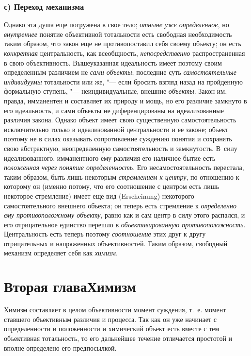 \subsection[с) Переход механизма]{с) Переход механизма}
Однако эта душа еще погружена в свое тело;
{\em отныне уже определенное},
но {\em внутреннее}
понятие объективной тотальности есть свободная необходимость
таким образом, что закон еще не противопоставил себя своему объекту; он
есть {\em конкретная}
центральность, как всеобщность,
{\em непосредственно}
распространенная в свою объективность. Вышеуказанная
идеальность имеет поэтому своим определенным различием не
{\em сами объекты};
последние суть
{\em самостоятельные индивидуумы}
тотальности или же, "--- если бросить взгляд
назад на пройденную формальную ступень, "--- неиндивидуальные,
внешние {\em объекты}.
Закон им, правда, имманентен и составляет их природу и мощь,
но его различие замкнуто в его идеальность, и сами объекты не
диференцированы на идеализованные различия закона. Однако объект имеет свою
существенную самостоятельность исключительно только в идеализованной
центральности и ее законе; объект поэтому не в силах оказывать
сопротивление суждению понятия и сохранять свою абстрактную, неопределенную
самостоятельность и замкнутость. В~силу идеализованного, имманентного ему
различия его наличное бытие есть
{\em положенная}
{\em через понятие определенность}.
Его несамостоятельность перестала, таким образом, быть лишь
некоторым {\em стремлением к центру},
по отношению к которому он (именно потому, что его
соотношение с центром есть лишь некоторое стремление) имеет еще вид
(Erscheinung) некоторого самостоятельного внешнего объекта;
он теперь есть стремление к
{\em определенно ему противоположному
объекту}, равно как и сам центр в силу этого распался, и его
отрицательное единство перешло в
{\em объективированную
противоположность}. Центральность есть теперь
поэтому
{\em соотношение} этих
друг к другу отрицательных и напряженных объективностей. Таким образом,
свободный механизм определяет себя как
{\em химизм}.

\chapter[Вторая глава Химизм]{Вторая глава\newline Химизм}
Химизм составляет в целом объективности момент суждения, т.~е.
момент ставшего объективным различия и процесса. Так как он уже начинает с
определенности и положенности и химический объект есть вместе с тем
объективная тотальность, то его дальнейшее течение отличается простотой и
вполне определено его предпосылкой.

